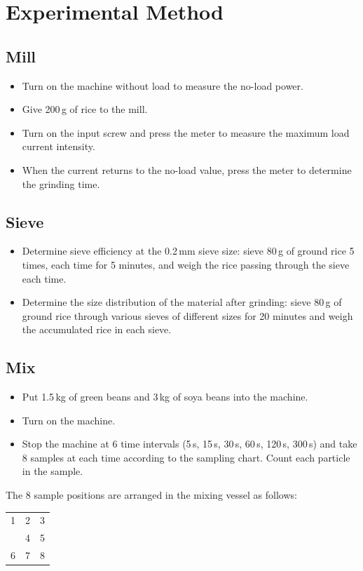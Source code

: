 \section{Experimental Method}

\subsection{Mill}
\begin{itemize}
    \item Turn on the machine without load to measure the no-load power.
    \item Give 200\,g of rice to the mill.
    \item Turn on the input screw and press the meter to measure the maximum load current intensity.
    \item When the current returns to the no-load value, press the meter to determine the grinding time.
\end{itemize}

\subsection{Sieve}
\begin{itemize}
    \item Determine sieve efficiency at the 0.2\,mm sieve size: sieve 80\,g of ground rice 5 times, each time for 5 minutes, and weigh the rice passing through the sieve each time.
    \item Determine the size distribution of the material after grinding: sieve 80\,g of ground rice through various sieves of different sizes for 20 minutes and weigh the accumulated rice in each sieve.
\end{itemize}

\subsection{Mix}
\begin{itemize}
    \item Put 1.5\,kg of green beans and 3\,kg of soya beans into the machine.
    \item Turn on the machine.
    \item Stop the machine at 6 time intervals (5\,s, 15\,s, 30\,s, 60\,s, 120\,s, 300\,s) and take 8 samples at each time according to the sampling chart. Count each particle in the sample.
\end{itemize}

The 8 sample positions are arranged in the mixing vessel as follows:

\begin{center}
\begin{tabular}{ccc}
    1 & 2 & 3 \\
      & 4 & 5 \\
    6 & 7 & 8 \\
\end{tabular}
\end{center}
